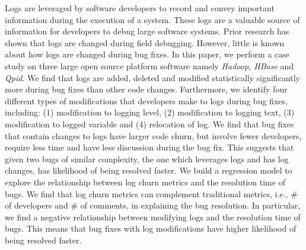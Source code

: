 Logs are leveraged by software developers to record and convey important information during the execution of a system. These logs are a valuable source of information for developers to debug large software systems. Prior research has shown that logs are changed during field debugging. However, little is known about how logs are changed during bug fixes. In this paper, we perform a  case study on three large open source platform software namely \emph{ Hadoop, HBase} and \emph{Qpid}. We find that logs are added, deleted and modified statistically significantly more during bug fixes than other code changes. Furthermore, we identify four different types of modifications that developers make to logs during bug fixes, including: (1) modification to logging level, (2) modification to logging text, (3) modification to logged variable and (4) relocation of log. We find that bug fixes that contain changes to logs have larger code churn, but involve fewer developers, require less time and have less discussion during the bug fix. This suggests that given two bugs of similar complexity, the one which leverages logs and has log changes, has likelihood of being resolved faster. We build a regression model to explore the relationship between log churn metrics and the resolution time of bugs. We find that log churn metrics can complement traditional metrics, i.e., \# of developers and \# of comments, in explaining the bug resolution. In particular, we find a negative relationship between modifying logs and the resolution time of bugs. This means that bug fixes with log modifications have higher likelihood of being resolved faster.